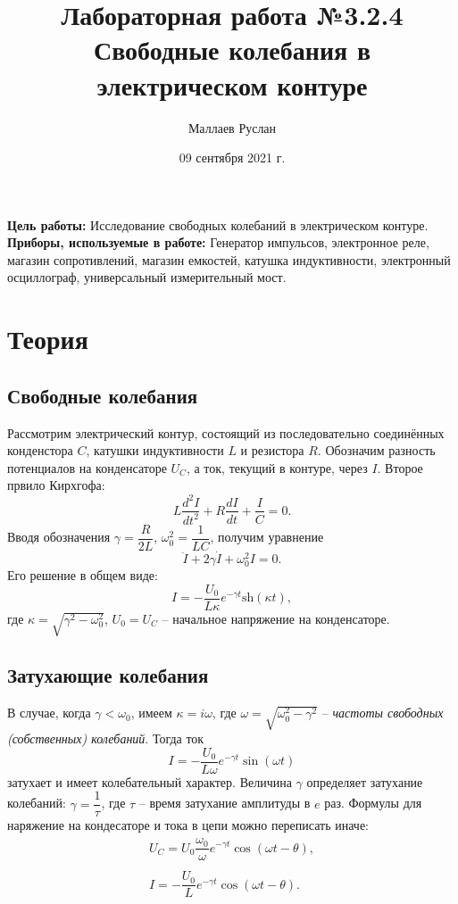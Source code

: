 \documentclass[a4paper,12pt]{article} %
\author{Маллаев Руслан}
\title{Лабораторная работа №3.2.4 \\ Свободные колебания в электрическом контуре}
\date{09 сентября 2021 г.}
\begin{document}

\maketitle
\newpage
 
 \textbf{Цель работы:} Исследование свободных колебаний в электрическом контуре.\\

\textbf{Приборы, используемые в работе:} Генератор импульсов, электронное реле, магазин сопротивлений, магазин емкостей, катушка индуктивности, электронный осциллограф, универсальный измерительный мост.

\section*{Теория}
\subsection*{Свободные колебания}
Рассмотрим электрический контур, состоящий из последовательно соединённых конденстора $C$, катушки индуктивности $L$ и резистора $R$. Обозначим разность потенциалов на конденсаторе $U_C$, а ток, текущий в контуре, через $I$. Второе првило Кирхгофа:
\begin{equation}
L \dfrac{d^2I}{dt^2}+R\dfrac{dI}{dt}+\dfrac{I}{C}=0.
\end{equation}
Вводя обозначения $\gamma = \dfrac{R}{2L}$, $\omega_0^2=\dfrac{1}{LC}$, получим уравнение
\begin{equation}
\ddot{I}+2\gamma\dot{I}+\omega_0^2I=0.
\end{equation}
Его решение в общем виде:
\begin{equation}
I = -\dfrac{U_0}{L\kappa}e^{-\gamma t}\text{sh}(\kappa t), 
\end{equation}
где $\kappa = \sqrt{\gamma^2 - \omega_0^2}$, $U_0 = U_C$ -- начальное напряжение на конденсаторе.

\subsection*{Затухающие колебания}
 В случае, когда $\gamma < \omega_0$, имеем $\kappa = i\omega$, где $\omega = \sqrt{\omega_0^2 - \gamma^2}$ -- \textit{частоты свободных (собственных) колебаний}. Тогда ток
 \begin{equation}
 I = -\dfrac{U_0}{L\omega}e^{-\gamma t}\sin(\omega t)
 \end{equation}
 затухает и имеет колебательный характер. Величина $\gamma$ определяет затухание колебаний: $\gamma = \dfrac{1}{\tau}$, где $\tau$ -- время затухание амплитуды в $e$ раз.
Формулы для наряжение на кондесаторе и тока в цепи можно переписать иначе:
\begin{equation}
\begin{array}{c}
U_C = U_0 \dfrac{\omega_0}{\omega}e^{-\gamma t} \cos(\omega t - \theta),\\
\\
I = -\dfrac{U_0}{L}e^{-\gamma t} \cos(\omega t - \theta).
\end{array}
\end{equation}
\end{document}

